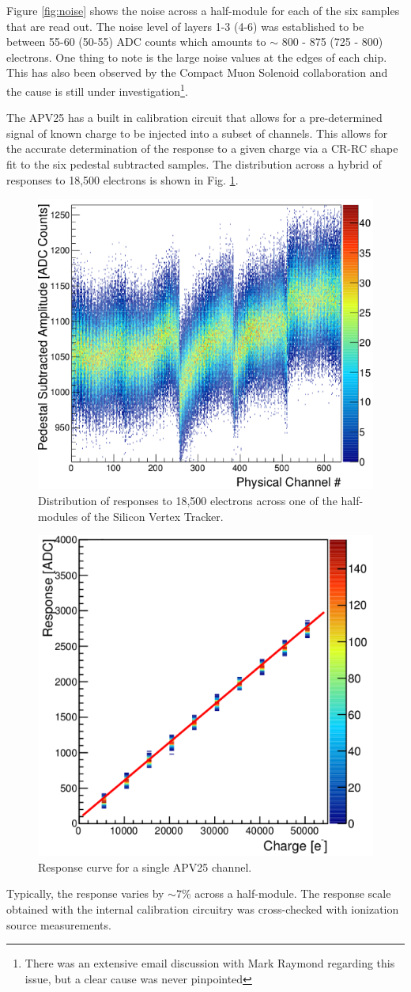 Figure \ref{fig:noise} shows the noise across a half-module for each of the 
six samples that are read out.
The noise level of layers 1-3 (4-6) was established
to be between 55-60 (50-55) ADC counts which amounts to $\sim$ 800 - 875 (725 - 800) 
electrons. One thing to note is the large noise values at
the edges of each chip.  This has also been observed by the Compact Muon
Solenoid collaboration
and the cause is still under investigation\footnote{There was an extensive email
discussion with Mark Raymond regarding this issue, but a clear cause was never
pinpointed}. 

The APV25 has a built in calibration circuit that allows for a 
pre-determined signal of known charge to be injected into a subset of channels.
This allows for the accurate determination of the response to a given charge 
via a CR-RC shape fit
to the six pedestal subtracted samples.  The distribution across a hybrid 
of responses to 18,500 electrons is shown in Fig. \ref{fig:response}.
\begin{figure}[h!t]
    \centering
    \includegraphics[width=.6\textwidth]{images/response.png}
    \caption{Distribution of responses to 18,500 electrons across one of the 
             half-modules of the Silicon Vertex Tracker.}
    \label{fig:response}
\end{figure}
\begin{figure}[h!b]
    \centering
    \includegraphics[width=.6\textwidth]{images/response_curve.png}
    \caption{Response curve for a single APV25 channel.}
    \label{fig:response_curve}
\end{figure}
Typically, the response varies by $\sim 7$\% across a half-module. 
The response scale obtained with
the internal calibration circuitry was cross-checked with ionization source
measurements.  

